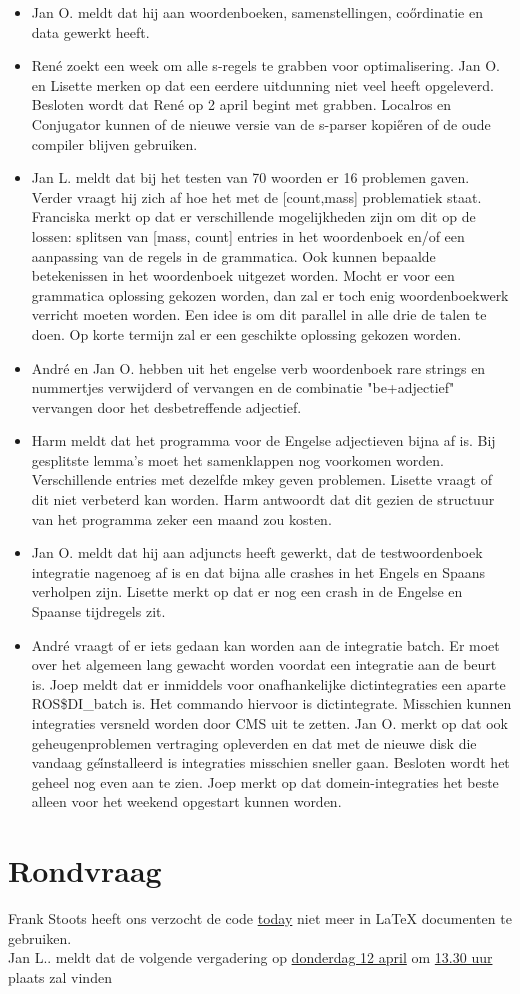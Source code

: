 \begin{itemize}
\item Jan O. meldt dat hij aan woordenboeken, samenstellingen, co\H{o}rdinatie en 
data gewerkt heeft. 
\item Ren\'{e} zoekt een week om alle s-regels te grabben voor optimalisering. 
Jan O. en Lisette merken op dat een eerdere uitdunning niet veel heeft 
opgeleverd. 
Besloten wordt dat Ren\'{e} op 2 april begint met grabben. Localros en Conjugator 
kunnen of de nieuwe versie van de s-parser kopi\H{e}ren of de oude compiler 
blijven gebruiken.
\item Jan L. meldt dat bij het testen 
van 70 woorden er 16 problemen gaven. Verder vraagt hij zich af hoe het met de 
[count,mass] problematiek staat. Franciska merkt op dat
er verschillende mogelijkheden zijn om dit op de lossen: splitsen van [mass,
count] entries in het woordenboek en/of een aanpassing van de regels in de 
grammatica. Ook kunnen bepaalde betekenissen in het woordenboek uitgezet worden.
Mocht er voor een grammatica oplossing gekozen worden, dan zal er toch enig 
woordenboekwerk verricht moeten worden. Een idee is om dit parallel in alle 
drie de talen te doen. Op korte termijn zal er een geschikte oplossing gekozen 
worden.
\item Andr\'{e} en Jan O. hebben uit het engelse verb woordenboek rare strings
 en 
nummertjes verwijderd of vervangen en de combinatie "be+adjectief" vervangen 
door het desbetreffende adjectief.
\item Harm meldt dat het programma voor de Engelse adjectieven bijna af is. Bij 
gesplitste lemma's moet het samenklappen nog voorkomen worden. Verschillende 
entries met dezelfde mkey geven problemen. Lisette vraagt of dit niet 
verbeterd kan worden. Harm antwoordt dat dit gezien de structuur van het 
programma zeker een maand zou kosten.
\item Jan O. meldt dat hij aan adjuncts heeft gewerkt, dat de testwoordenboek 
integratie nagenoeg af is en dat bijna alle crashes in het Engels en Spaans 
verholpen zijn. Lisette merkt op dat er nog een crash in de Engelse en Spaanse 
tijdregels zit.
\item Andr\'{e} vraagt of er iets gedaan kan worden aan de integratie batch. 
Er moet over het algemeen lang gewacht worden voordat een integratie aan de 
beurt is. Joep meldt dat er 
inmiddels voor onafhankelijke dictintegraties een aparte ROS\$DI\_batch is. Het 
commando hiervoor is dictintegrate. Misschien kunnen integraties versneld 
worden door CMS uit te zetten. Jan O. merkt op dat ook geheugenproblemen 
vertraging opleverden en dat met de nieuwe disk die vandaag ge\H{i}nstalleerd 
is integraties misschien sneller gaan. Besloten wordt het geheel nog even aan 
te zien. Joep merkt op dat domein-integraties het beste alleen voor het weekend 
opgestart kunnen worden.
\end{itemize}


\section {Rondvraag}

Frank Stoots heeft ons verzocht de code \underline{today} niet meer in \LaTeX
documenten te gebruiken.\\

\noindent Jan L.. meldt dat de volgende vergadering op \underline{donderdag 12 
april} om \underline{13.30 uur} plaats zal vinden 

